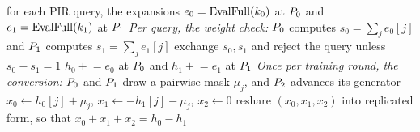 \begin{algorithm}[h]
\caption{The harvest and the weight check (\texttt{src/pir/harvest.cpp}).}
\label{alg:harvest}
\begin{algorithmic}[1]
\Require for each PIR query, the expansions $e_0 = \operatorname{EvalFull}(k_0)$ at
  $P_{0}$ and $e_1 = \operatorname{EvalFull}(k_1)$ at $P_{1}$
\Statex \textit{Per query, the weight check:}
\State $P_{0}$ computes $s_0 = \sum_j e_0[j]$ and $P_{1}$ computes
  $s_1 = \sum_j e_1[j]$ 
\State exchange $s_0, s_1$ and reject the query unless $s_0 - s_1 = 1$
\State $h_0 \mathrel{+}= e_0$ at $P_{0}$ and $h_1 \mathrel{+}= e_1$ at
  $P_{1}$ 
\Statex \textit{Once per training round, the conversion:}
  \State $P_{0}$ and $P_{1}$ draw a pairwise mask $\mu_j$, and
    $P_{2}$ advances its generator
  \State $x_0 \gets h_0[j] + \mu_j$, \quad $x_1 \gets -h_1[j] - \mu_j$, \quad
    $x_2 \gets 0$
\EndFor
\State reshare $(x_0, x_1, x_2)$ into replicated form, so that
  $x_0 + x_1 + x_2 = h_0 - h_1$ 
\end{algorithmic}
\end{algorithm}

\clearpage
